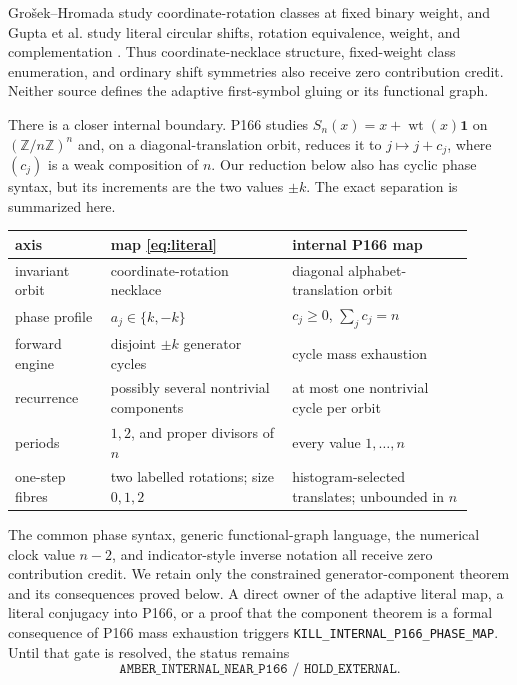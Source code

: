 \documentclass[a4paper,10pt]{amsart}
\theoremstyle{remark}
\newcommand{\Z}{\mathbb Z}
\newcommand{\wt}{\operatorname{wt}}
\newcommand{\1}{\mathbf 1}
\begin{document}
Gro\v sek--Hromada study coordinate-rotation classes at fixed binary weight,
and Gupta et al. study literal circular shifts, rotation equivalence,
weight, and complementation \cite{GrosekHromada2016,GuptaEtAl2022}.  Thus
coordinate-necklace structure, fixed-weight class enumeration, and ordinary
shift symmetries also receive zero contribution credit.  Neither source
defines the adaptive first-symbol gluing or its functional graph.

There is a closer internal boundary.  P166 studies
$S_n(x)=x+\wt(x)\1$ on $(\Z/n\Z)^n$ and, on a diagonal-translation orbit,
reduces it to $j\mapsto j+c_j$, where $(c_j)$ is a weak composition of $n$.
Our reduction below also has cyclic phase syntax, but its increments are the
two values $\mathord{\pm}k$.  The exact separation is summarized here.

\begin{center}
\small
\renewcommand{\arraystretch}{1.08}
\begin{tabular}{@{}>{\raggedright\arraybackslash}p{0.19\linewidth}>{\raggedright\arraybackslash}p{0.36\linewidth}>{\raggedright\arraybackslash}p{0.36\linewidth}@{}}
\hline
axis & map \eqref{eq:literal} & internal P166 map \\
\hline
invariant orbit & coordinate-rotation necklace & diagonal alphabet-translation orbit \\
phase profile & $a_j\in\{k,-k\}$ & $c_j\geq0$, $\sum_jc_j=n$ \\
forward engine & disjoint $\mathord{\pm}k$ generator cycles & cycle mass exhaustion \\
recurrence & possibly several nontrivial components & at most one nontrivial cycle per orbit \\
periods & $1,2$, and proper divisors of $n$ & every value $1,\ldots,n$ \\
one-step fibres & two labelled rotations; size $0,1,2$ & histogram-selected translates; unbounded in $n$ \\
\hline
\end{tabular}
\end{center}

The common phase syntax, generic functional-graph language, the numerical
clock value $n-2$, and indicator-style inverse notation all receive zero
contribution credit.  We retain only the constrained generator-component
theorem and its consequences proved below.  A direct owner of the adaptive
literal map, a literal conjugacy into P166, or a proof that the component
theorem is a formal consequence of P166 mass exhaustion triggers
\texttt{KILL\_INTERNAL\_P166\_PHASE\_MAP}.  Until that gate is resolved, the
status remains
\[
 \texttt{AMBER\_INTERNAL\_NEAR\_P166 / HOLD\_EXTERNAL}.
\]
\end{document}
